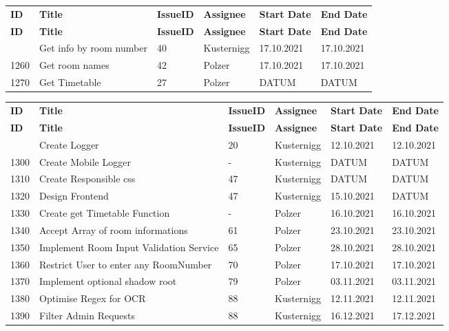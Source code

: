 
\begin{longtable}{|p{}|p{}|p{}|p{}|p{}|p{}|} \hline
    \textbf{ID} & \textbf{Title} & \textbf{Issue\-ID} & \textbf{Assignee} & \textbf{Start Date} & \textbf{End\- Date} \\ \hhline{|=|=|=|=|=|=|}
    \endfirsthead
    \hline
    \textbf{ID} & \textbf{Title} & \textbf{Issue\-ID} & \textbf{Assignee} & \textbf{Start Date} & \textbf{End\- Date} \\ \hhline{|=|=|=|=|=|=|}
    \endhead
    1180 & Get info by room number & 40 & Kusternigg & 17.10.2021 & 17.10.2021 \\ \hline
    1260 & Get room names & 42 & Polzer & 17.10.2021 & 17.10.2021 \\ \hline
    1270 & Get Timetable & 27 & Polzer & DATUM & DATUM \\ \hline
\end{longtable}


\begin{longtable}{|p{}|p{}|p{}|p{}|p{}|p{}|} \hline
    \textbf{ID} & \textbf{Title} & \textbf{Issue\-ID} & \textbf{Assignee} & \textbf{Start Date} & \textbf{End\- Date} \\ \hhline{|=|=|=|=|=|=|}
    \endfirsthead
    \hline
    \textbf{ID} & \textbf{Title} & \textbf{Issue\-ID} & \textbf{Assignee} & \textbf{Start Date} & \textbf{End\- Date} \\ \hhline{|=|=|=|=|=|=|}
    \endhead
    1280 & Create Logger & 20 & Kusternigg & 12.10.2021 & 12.10.2021 \\ \hline
    1300 & Create Mobile Logger & - & Kusternigg & DATUM & DATUM \\ \hline
    1310 & Create Responsible css & 47 & Kusternigg & DATUM & DATUM \\ \hline
    1320 & Design Frontend & 47 & Kusternigg & 15.10.2021 & DATUM \\ \hline
    1330 & Create get Timetable Function & - & Polzer & 16.10.2021 & 16.10.2021 \\ \hline
    1340 & Accept Array of room informations & 61 & Polzer & 23.10.2021 & 23.10.2021 \\ \hline
    1350 & Implement Room Input Validation Service & 65 & Polzer & 28.10.2021 & 28.10.2021 \\ \hline
    1360 & Restrict User to enter any RoomNumber & 70 & Polzer & 17.10.2021 & 17.10.2021 \\ \hline
    1370 & Implement optional shadow root & 79  & Polzer & 03.11.2021 & 03.11.2021 \\ \hline
    1380 & Optimise Regex for OCR & 88  & Kusternigg & 12.11.2021 & 12.11.2021 \\ \hline
    1390 & Filter Admin Requests & 88  & Kusternigg & 16.12.2021 & 17.12.2021 \\ \hline
\end{longtable}

